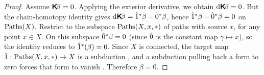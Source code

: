 \documentclass[10pt,reqno,letterpaper,twoside]{amsbook}
\begin{document}
  \begin{proof}
    Assume $\boldsymbol{\mathsf{K}}\!\beta = 0$.
    Applying the exterior derivative,
    we obtain $\mathrm{d}\boldsymbol{\mathsf{K}}\!\beta = 0$.
    But the chain-homotopy identity gives $\mathrm{d}\boldsymbol{\mathsf{K}}\!\beta = \hat 1^*\beta - \hat 0^*\beta$,
    hence $\hat 1^*\beta - \hat 0^*\beta = 0$ on $\operatorname{Paths}(X)$.
    Restrict to the subspace $\operatorname{Paths}(X,x,\ast)$ of paths with source $x$,
    for any point $x \in X$.
    On this subspace $\hat 0^*\beta = 0$ (since $\hat 0$ is the constant map $\gamma \mapsto x$),
    so the identity reduces to $\hat 1^*(\beta) = 0$.
    Since $X$ is connected,
    the target map $\hat 1: \operatorname{Paths}(X,x,\ast) \to X$ is a subduction
    \cite[]{PIZ13},
    and a subduction pulling back a form to zero forces that form to vanish
    \cite[]{PIZ13}.
    Therefore $\beta = 0$.
  \end{proof}
  
\end{document}
